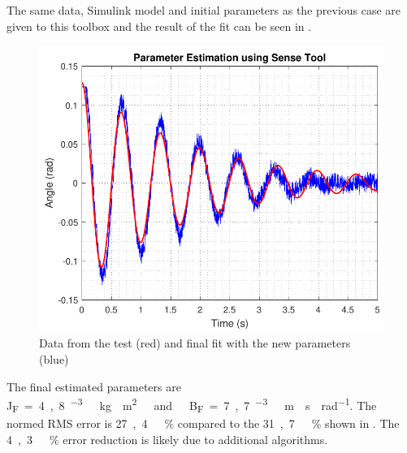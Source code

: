 The same data, Simulink model and initial parameters as the previous case are given to this toolbox and the result of the fit can be seen in . 
%
\begin{figure}[H]
	\centering
	\includegraphics[scale=0.7]{figures/SenseToolParameterEstimation}
	\caption{Data from the test (red) and final fit with the new parameters (blue)}
	\label{SenseToolParameterEstimation}
\end{figure}

The final estimated parameters are \si{J_F=4,8 ^{-3}\ kg \cdot m^2\ and\ B_F=7,7 ^{-3}\ m \cdot s \cdot rad^{-1}}. The normed RMS error is \si{27,4\ \%} compared to the \si{31,7\ \%} shown in . The \si{4,3\ \%} error reduction is likely due to additional algorithms.

